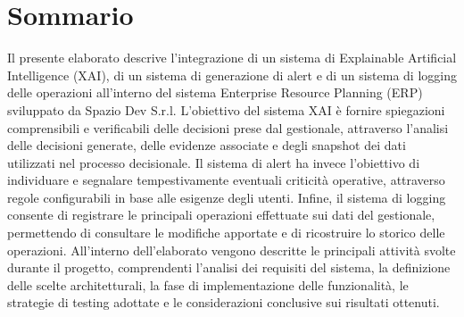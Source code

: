 \cleardoublepage
{}
{}
\begingroup
\let\clearpage\relax
\let\cleardoublepage\relax
\chapter*{Sommario}

Il presente elaborato descrive l'integrazione di un sistema di Explainable Artificial Intelligence (XAI), di un sistema di generazione di alert e di un sistema di logging 
delle operazioni all'interno del sistema Enterprise Resource Planning (ERP) sviluppato da Spazio Dev S.r.l.
\newline
L'obiettivo del sistema XAI è fornire spiegazioni comprensibili e verificabili delle decisioni prese dal gestionale, attraverso l'analisi delle decisioni generate, 
delle evidenze associate e degli snapshot dei dati utilizzati nel processo decisionale. Il sistema di alert ha invece l'obiettivo di individuare e segnalare tempestivamente 
eventuali criticità operative, attraverso regole configurabili in base alle esigenze degli utenti. Infine, il sistema di logging consente di registrare le principali operazioni 
effettuate sui dati del gestionale, permettendo di consultare le modifiche apportate e di ricostruire lo storico delle operazioni.
\newline
All'interno dell'elaborato vengono descritte le principali attività svolte durante il progetto, comprendenti l'analisi dei requisiti del sistema, la definizione delle scelte 
architetturali, la fase di implementazione delle funzionalità, le strategie di testing adottate e le considerazioni conclusive sui risultati ottenuti.


\endgroup
\vfill
